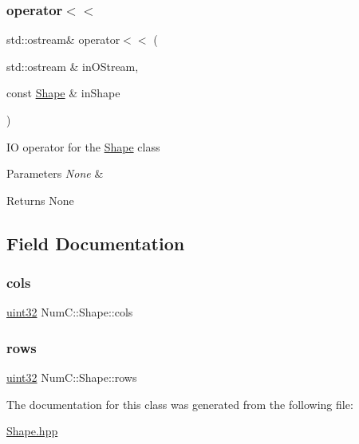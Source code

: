 \subsubsection{\texorpdfstring{operator$<$$<$}{operator<<}}
{\footnotesize\ttfamily std\+::ostream\& operator$<$$<$ (\begin{DoxyParamCaption}\item[{std\+::ostream \&}]{in\+O\+Stream,  }\item[{const \mbox{\hyperlink{class_num_c_1_1_shape}{Shape}} \&}]{in\+Shape }\end{DoxyParamCaption})\hspace{0.3cm}{\ttfamily [friend]}}

IO operator for the \mbox{\hyperlink{class_num_c_1_1_shape}{Shape}} class


\begin{DoxyParams}{Parameters}
{\em None} & \\
\hline
\end{DoxyParams}
\begin{DoxyReturn}{Returns}
None 
\end{DoxyReturn}


\subsection{Field Documentation}
\mbox{\label{class_num_c_1_1_shape_a21b0f7b0587aad86f050e7086ceea9e7}} 
\subsubsection{\texorpdfstring{cols}{cols}}
{\footnotesize\ttfamily \mbox{\hyperlink{namespace_num_c_ae685802ca6d3035f2b400b081e3953fa}{uint32}} Num\+C\+::\+Shape\+::cols}

\mbox{\label{class_num_c_1_1_shape_a9535da39217424a1afb81c0a7baa3acc}} 
\subsubsection{\texorpdfstring{rows}{rows}}
{\footnotesize\ttfamily \mbox{\hyperlink{namespace_num_c_ae685802ca6d3035f2b400b081e3953fa}{uint32}} Num\+C\+::\+Shape\+::rows}



The documentation for this class was generated from the following file\+:\begin{DoxyCompactItemize}
\item 
\mbox{\hyperlink{_shape_8hpp}{Shape.\+hpp}}\end{DoxyCompactItemize}

